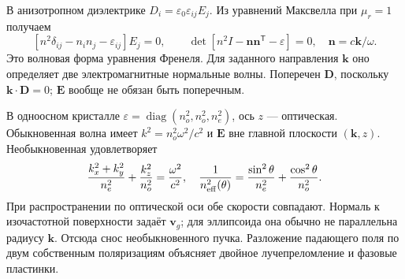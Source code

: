 
В анизотропном диэлектрике $D_i=\varepsilon_0\varepsilon_{ij}E_j$. Из уравнений Максвелла при $\mu_r=1$ получаем
\begin{equation}
 \left[n^2\delta_{ij}-n_in_j-\varepsilon_{ij}\right]E_j=0,
 \qquad \det\left[n^2I-\bm n\bm n^{\mathsf T}-\varepsilon\right]=0,
 \quad \bm n=c\bm k/\omega.
\end{equation}
Это волновая форма уравнения Френеля. Для заданного направления $\bm k$ оно определяет две электромагнитные нормальные волны. Поперечен $\bm D$, поскольку $\bm k\cdot\bm D=0$; $\bm E$ вообще не обязан быть поперечным.

В одноосном кристалле $\varepsilon=\operatorname{diag}(n_o^2,n_o^2,n_e^2)$, ось $z$ — оптическая. Обыкновенная волна имеет $k^2=n_o^2\omega^2/c^2$ и $\bm E$ вне главной плоскости $(\bm k,z)$. Необыкновенная удовлетворяет
\begin{equation}
 \frac{k_x^2+k_y^2}{n_e^2}+\frac{k_z^2}{n_o^2}=\frac{\omega^2}{c^2},\quad
 \frac1{n_{\rm eff}^2(\theta)}=\frac{\sin^2\theta}{n_e^2}+\frac{\cos^2\theta}{n_o^2}.
\end{equation}
При распространении по оптической оси обе скорости совпадают. Нормаль к изочастотной поверхности задаёт $\bm v_g$; для эллипсоида она обычно не параллельна радиусу $\bm k$. Отсюда снос необыкновенного пучка. Разложение падающего поля по двум собственным поляризациям объясняет двойное лучепреломление и фазовые пластинки.

